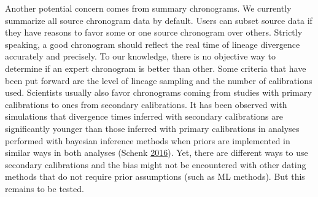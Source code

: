 \documentclass[]{article}
\begin{document}
Another potential concern comes from summary chronograms. We currently summarize all source chronogram data by default. Users can subset source data if they have reasons to favor some or one source chronogram over others. Strictly speaking, a good chronogram should reflect the real time of lineage divergence accurately and precisely. To our knowledge, there is no objective way to determine if an expert chronogram is better than other. Some criteria that have been put forward are the level of lineage sampling and the number of calibrations used. Scientists usually also favor chronograms coming from studies with primary calibrations to ones from secondary calibrations. It has been observed with simulations that divergence times inferred with secondary calibrations are significantly younger than those inferred with primary calibrations in analyses performed with bayesian inference methods when priors are implemented in similar ways in both analyses (Schenk \protect\hyperlink{ref-schenk2016sec}{2016}). Yet, there are different ways to use secondary calibrations and the bias might not be encountered with other dating methods that do not require prior assumptions (such as ML methods). But this remains to be tested.
\end{document}
